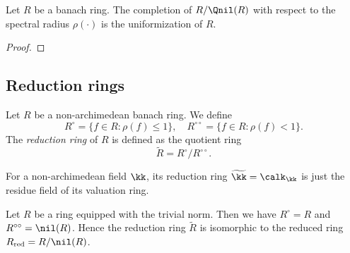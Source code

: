     \begin{proposition}\label{prop:the_uniformization_of_banach_rings_given_by_spectral_radius}
        Let \(R\) be a banach ring.
        The completion of \(R/\Qnil(R)\) with respect to the spectral radius \(\rho(\cdot)\) is the uniformization of \(R\).
    \end{proposition}
    \begin{proof}
    \end{proof}

\subsection{Reduction rings}

    \begin{definition}\label{def:reduction_ring_of_nonarchimedean_banach_ring}
        Let \(R\) be a non-archimedean banach ring.
        We define 
        \[
            R^\circ = \{ f \in R : \rho(f) \leq 1 \}, \quad R^{\circ \circ} = \{ f \in R : \rho(f) < 1 \}.
        \]
        The \emph{reduction ring} of \(R\) is defined as the quotient ring
        \[ \widetilde{R} = R^\circ / R^{\circ \circ}. \]
    \end{definition}

    For a non-archimedean field \(\kk\), its reduction ring \(\widetilde{\kk} = \calk_\kk\) is just the residue field of its valuation ring.
    
    \begin{example}\label{eg:reduction_ring_of_trivial_normed_rings}
        Let \(R\) be a ring equipped with the trivial norm.
        Then we have \(R^\circ = R\) and \(R^{\circ \circ} = \nil(R)\).
        Hence the reduction ring \(\widetilde{R}\) is isomorphic to the reduced ring \(R_{\text{red}} = R/\nil(R)\).
    \end{example}

    



